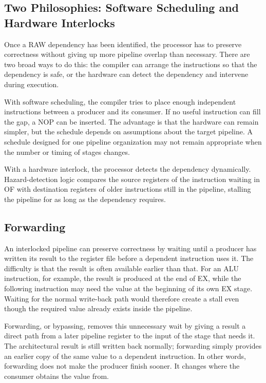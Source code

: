 \documentclass[11pt,a4paper]{report}
\begin{document}
\subsection{Two Philosophies: Software Scheduling and Hardware Interlocks}

Once a RAW dependency has been identified, the processor has to preserve correctness without giving up more pipeline overlap than necessary. There are two broad ways to do this: the compiler can arrange the instructions so that the dependency is safe, or the hardware can detect the dependency and intervene during execution.

With software scheduling, the compiler tries to place enough independent instructions between a producer and its consumer. If no useful instruction can fill the gap, a NOP can be inserted. The advantage is that the hardware can remain simpler, but the schedule depends on assumptions about the target pipeline. A schedule designed for one pipeline organization may not remain appropriate when the number or timing of stages changes.

With a hardware interlock, the processor detects the dependency dynamically. Hazard-detection logic compares the source registers of the instruction waiting in OF with destination registers of older instructions still in the pipeline, stalling the pipeline for as long as the dependency requires.

\subsection{Forwarding}
\label{sec:forwarding}

An interlocked pipeline can preserve correctness by waiting until a producer has written its result to the register file before a dependent instruction uses it. The difficulty is that the result is often available earlier than that. For an ALU instruction, for example, the result is produced at the end of EX, while the following instruction may need the value at the beginning of its own EX stage. Waiting for the normal write-back path would therefore create a stall even though the required value already exists inside the pipeline.

Forwarding, or bypassing, removes this unnecessary wait by giving a result a direct path from a later pipeline register to the input of the stage that needs it. The architectural result is still written back normally; forwarding simply provides an earlier copy of the same value to a dependent instruction. In other words, forwarding does not make the producer finish sooner. It changes where the consumer obtains the value from.
\end{document}
